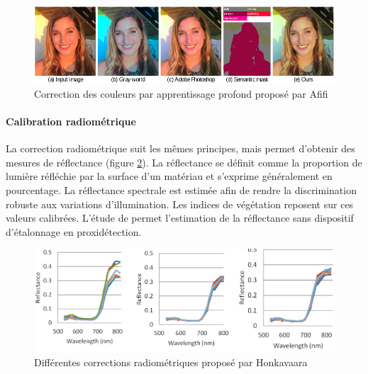 \documentclass[../thesis.tex]{subfiles}
\begin{document}
    \begin{figure}[H]
        \centering
        \includegraphics[width=0.7\linewidth]{img/biblio/color-consistancy}
        \caption{Correction des couleurs par apprentissage profond proposé par Afifi}
        \label{fig:03-color-consistancy}
    \end{figure}
    
    
    \vspace{-0.5em}
    \paragraph{Calibration radiométrique} La correction radiométrique suit les mêmes principes, mais permet d'obtenir des mesures de réflectance \cite{rs10020256} (figure \ref{fig:03-radiometric-correction}). La réflectance se définit comme la proportion de lumière réfléchie par la surface d'un matériau et s'exprime généralement en pourcentage. La réflectance spectrale est estimée afin de rendre la discrimination robuste aux variations d'illumination. Les indices de végétation reposent sur ces valeurs calibrées. L'étude de \cite{s21113601} permet l'estimation de la réflectance sans dispositif d'étalonnage en proxidétection.
    
    \begin{figure}[H]
        \centering
        \includegraphics[width=0.7\linewidth]{img/biblio/radiometric-correction}
        \caption{Différentes corrections radiométriques proposé par Honkavaara}
        \label{fig:03-radiometric-correction}
    \end{figure}
    
\end{document}

